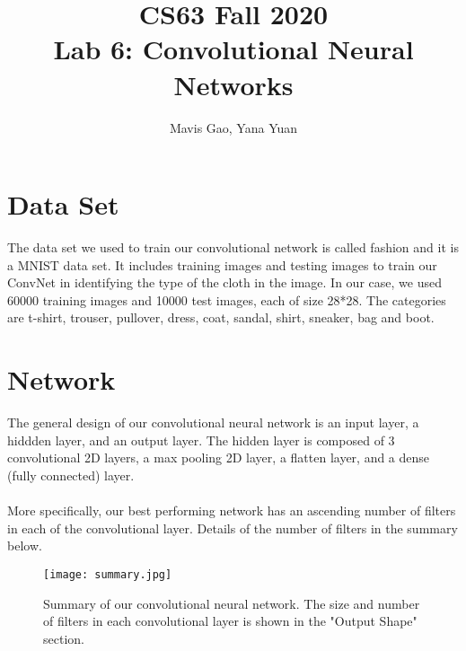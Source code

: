 \documentclass[11pt]{article}
\title{CS63 Fall 2020\\Lab 6: Convolutional Neural Networks}
\author{Mavis Gao, Yana Yuan}
\date{}
\begin{document}

\maketitle

\section{Data Set}

The data set we used to train our convolutional network is called fashion
and it is a MNIST data set. It includes training images and testing images
to train our ConvNet in identifying the type of the cloth in the image.
In our case, we used 60000 training images and 10000 test images, each of 
size 28*28. The categories are t-shirt, trouser, pullover, dress, coat, 
sandal, shirt, sneaker, bag and boot. 

\section{Network}


The general design of our convolutional neural network is an input layer, 
a hiddden layer, and an output layer. The hidden layer is composed of 
3 convolutional 2D layers, a max pooling 2D layer, a flatten layer, and a dense
(fully connected) layer. \\ \\More specifically, our best performing network has an ascending number of
filters in each of the convolutional layer. Details of the number of filters in
the summary below.

\begin{figure}[H]
  \begin{center}
  \texttt{[image: summary.jpg]}
  \end{center}
  \caption{Summary of our convolutional neural network. The size and
  number of filters in each convolutional layer is shown in the "Output Shape" section.}
  \label{environment}
  \end{figure}
\end{document}
